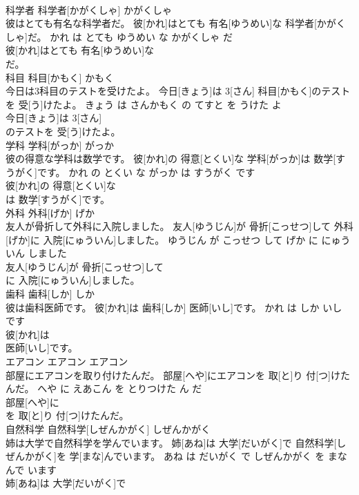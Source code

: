 \documentclass[8pt]{extreport}
\begin{document}
\begin{CJK}{UTF8}{min}
\\	科学者	科学者[かがくしゃ]	かがくしゃ	
\\	彼はとても有名な科学者だ。	彼[かれ]はとても 有名[ゆうめい]な 科学者[かがくしゃ]だ。	かれ は とても ゆうめい な かがくしゃ だ	
\\	彼[かれ]はとても 有名[ゆうめい]な
\\	だ。			
\\	科目	科目[かもく]	かもく	
\\	今日は3科目のテストを受けたよ。	今日[きょう]は 3[さん] 科目[かもく]のテストを 受[う]けたよ。	きょう は さんかもく の てすと を うけた よ	
\\	今日[きょう]は 3[さん]
\\	のテストを 受[う]けたよ。			
\\	学科	学科[がっか]	がっか	
\\	彼の得意な学科は数学です。	彼[かれ]の 得意[とくい]な 学科[がっか]は 数学[すうがく]です。	かれ の とくい な がっか は すうがく です	
\\	彼[かれ]の 得意[とくい]な
\\	は 数学[すうがく]です。			
\\	外科	外科[げか]	げか	
\\	友人が骨折して外科に入院しました。	友人[ゆうじん]が 骨折[こっせつ]して 外科[げか]に 入院[にゅういん]しました。	ゆうじん が こっせつ して げか に にゅういん しました	
\\	友人[ゆうじん]が 骨折[こっせつ]して
\\	に 入院[にゅういん]しました。			
\\	歯科	歯科[しか]	しか	
\\	彼は歯科医師です。	彼[かれ]は 歯科[しか] 医師[いし]です。	かれ は しか いし です	
\\	彼[かれ]は
\\	医師[いし]です。			
\\	エアコン	エアコン	エアコン	
\\	部屋にエアコンを取り付けたんだ。	部屋[へや]にエアコンを 取[と]り 付[つ]けたんだ。	へや に えあこん を とりつけた ん だ	
\\	部屋[へや]に
\\	を 取[と]り 付[つ]けたんだ。			
\\	自然科学	自然科学[しぜんかがく]	しぜんかがく	
\\	姉は大学で自然科学を学んでいます。	姉[あね]は 大学[だいがく]で 自然科学[しぜんかがく]を 学[まな]んでいます。	あね は だいがく で しぜんかがく を まなんで います	
\\	姉[あね]は 大学[だいがく]で

\end{CJK}
\end{document}
